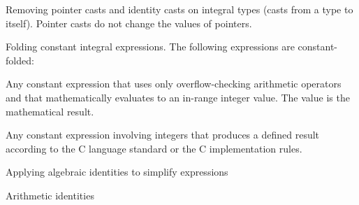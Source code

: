 \begin{compactenum}
\item
  Removing pointer casts and identity casts on integral types (casts
  from a type to itself). Pointer casts do not change the values of
  pointers.
\item
  Folding constant integral expressions. The following expressions are
  constant-folded:

  \begin{compactenum}
  \item
    Any constant expression that uses only overflow-checking arithmetic
    operators and that mathematically evaluates to an in-range integer
    value. The value is the mathematical result.
  \item
    Any constant expression involving integers that produces a defined
    result according to the C language standard or the C implementation
    rules.
  \end{compactenum}
\item
  Applying algebraic identities to simplify expressions

  \begin{compactenum}
  \item
    Arithmetic identities


\end{compactenum}
\end{compactenum}
